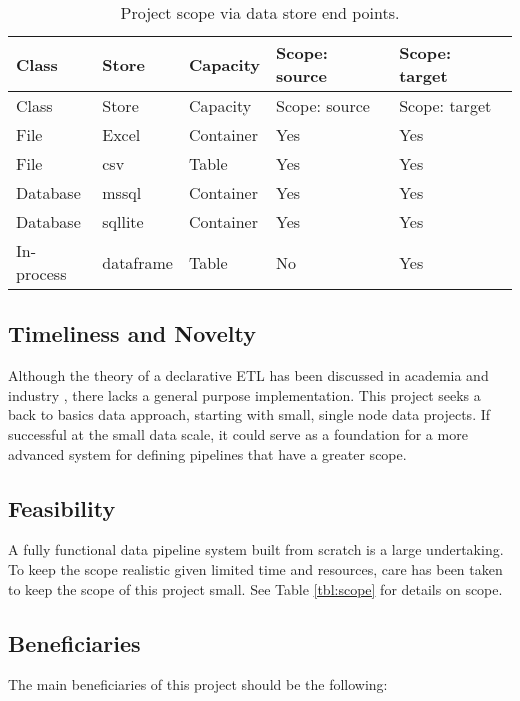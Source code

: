 \begin{longtable}[]{@{}lllll@{}}
\caption{\label{tbl:ep}Project scope via data store end
points.}\tabularnewline
\toprule\noalign{}
Class & Store & Capacity & Scope: source & Scope: target \\
\midrule\noalign{}
\endfirsthead
\toprule\noalign{}
Class & Store & Capacity & Scope: source & Scope: target \\
\midrule\noalign{}
\endhead
\bottomrule\noalign{}
\endlastfoot
File & Excel & Container & Yes & Yes \\
File & csv & Table & Yes & Yes \\
Database & mssql & Container & Yes & Yes \\
Database & sqllite & Container & Yes & Yes \\
In-process & dataframe & Table & No & Yes \\
\end{longtable}

\subsection{Timeliness and Novelty}\label{timeliness-and-novelty}

Although the theory of a declarative ETL has been discussed in academia
\citep{ingestbase} and industry \citep{mded}, there lacks a general
purpose implementation. This project seeks a back to basics data
approach, starting with small, single node data projects. If successful
at the small data scale, it could serve as a foundation for a more
advanced system for defining pipelines that have a greater scope.

\subsection{Feasibility}\label{feasibility}

A fully functional data pipeline system built from scratch is a large
undertaking. To keep the scope realistic given limited time and
resources, care has been taken to keep the scope of this project small.
See Table \ref{tbl:scope} for details on scope.

\subsection{Beneficiaries}\label{beneficiaries}

The main beneficiaries of this project should be the following:

